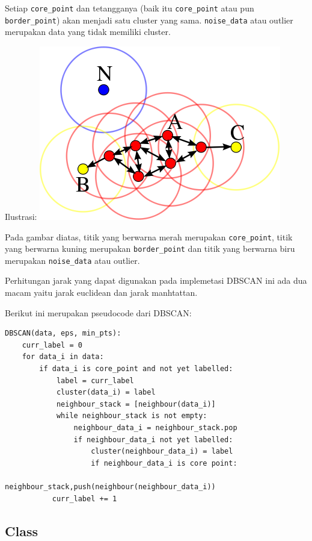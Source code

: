 \documentclass[11pt]{article}
\makeatletter
\def\maxwidth{\ifdim\Gin@nat@width>\linewidth\linewidth
    \else\Gin@nat@width\fi}
\let\Oldincludegraphics\includegraphics
\renewcommand{\includegraphics}[1]{\Oldincludegraphics[width=.8\maxwidth]{#1}}
\makeatother
\begin{document}
Setiap \texttt{core\_point} dan tetangganya (baik itu
\texttt{core\_point} atau pun \texttt{border\_point}) akan menjadi satu
cluster yang sama. \texttt{noise\_data} atau outlier merupakan data yang
tidak memiliki cluster.

Ilustrasi: \includegraphics{img/dbscan.png}

Pada gambar diatas, titik yang berwarna merah merupakan
\texttt{core\_point}, titik yang berwarna kuning merupakan
\texttt{border\_point} dan titik yang berwarna biru merupakan
\texttt{noise\_data} atau outlier.

Perhitungan jarak yang dapat digunakan pada implemetasi DBSCAN ini ada
dua macam yaitu jarak euclidean dan jarak manhtattan.

Berikut ini merupakan pseudocode dari DBSCAN:

\begin{verbatim}
DBSCAN(data, eps, min_pts):
    curr_label = 0
    for data_i in data:
        if data_i is core_point and not yet labelled:
            label = curr_label
            cluster(data_i) = label
            neighbour_stack = [neighbour(data_i)]
            while neighbour_stack is not empty:
                neighbour_data_i = neighbour_stack.pop
                if neighbour_data_i not yet labelled:
                    cluster(neighbour_data_i) = label
                    if neighbour_data_i is core point:
                        neighbour_stack,push(neighbour(neighbour_data_i))
           curr_label += 1
\end{verbatim}

    \subsection{Class}\label{class}
\end{document}
